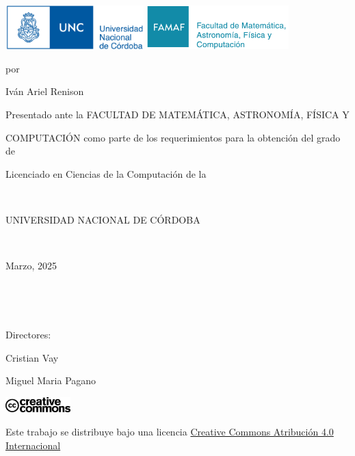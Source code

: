 \begin{center}
  \thispagestyle{empty} %

  \vspace{0.5cm}

  \begin{minipage}[t]{\textwidth}
      \raggedright
      \includegraphics[height=1.7cm]{logos/unc.jpg} %
      \hfill
      \includegraphics[height=1.7cm]{logos/famaf.png} %
  \end{minipage}

  \vspace{3cm} %

  \begin{huge}
    \textbf{\tituloTesis}
  \end{huge}

  \vspace{0.3cm}

  por

  {\Large Iván Ariel Renison}

  \vspace{2cm}

  Presentado ante la FACULTAD DE MATEMÁTICA, ASTRONOMÍA, FÍSICA Y

  COMPUTACIÓN como parte de los requerimientos para la obtención del grado de

  Licenciado en Ciencias de la Computación de la

  \

  UNIVERSIDAD NACIONAL DE CÓRDOBA

  \

  Marzo, 2025

  \

  \

  \begin{large}
    Directores:

    Cristian Vay

    Miguel Maria Pagano
  \end{large}


  \vfill

  \includegraphics[height=0.6cm]{logos/cc.png}

  Este trabajo se distribuye bajo una licencia \href{https://creativecommons.org/licenses/by/4.0/?ref=chooser-v1}{Creative Commons Atribución 4.0 Internacional} \ccby

  \vspace{0.5cm}
\end{center}
\newpage
